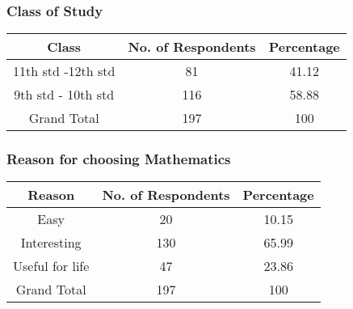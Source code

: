 \documentclass{article}
\begin{document}

\subsubsection{Class of Study}
\begin{tabular}{ |c|c|c| }
    \hline
    Class & No. of Respondents & Percentage \\
    \hline
    11th std -12th std & 81 & 41.12 \\
    9th std - 10th std & 116 & 58.88 \\
    Grand Total & 197 & 100\\
    \hline    
\end{tabular}

\subsubsection{Reason for choosing Mathematics}
\begin{tabular}{ |c|c|c| }
    \hline
    Reason & No. of Respondents & Percentage \\
    \hline
    Easy & 20 & 10.15 \\
    Interesting & 130 & 65.99 \\
    Useful for life & 47 & 23.86 \\
    Grand Total & 197 & 100\\
    \hline    
\end{tabular}
\end{document}
